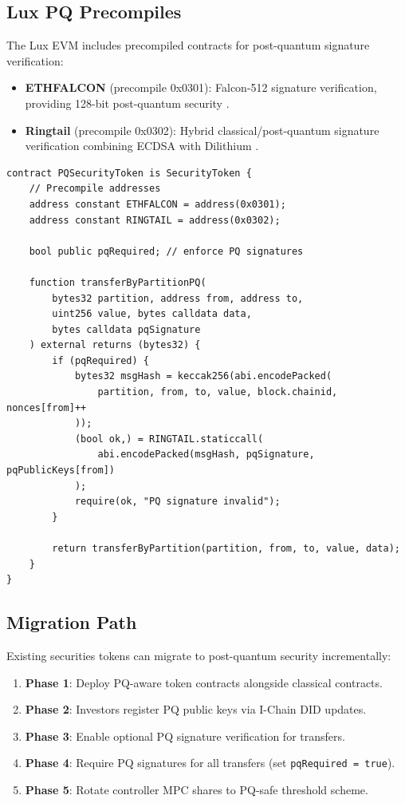 \documentclass[11pt,a4paper]{article}
\begin{document}
\subsection{Lux PQ Precompiles}

The Lux EVM includes precompiled contracts for post-quantum signature verification:

\begin{itemize}[nosep]
  \item \textbf{ETHFALCON} (precompile 0x0301): Falcon-512 signature verification, providing 128-bit post-quantum security \cite{lux-ethfalcon-pq}.
  \item \textbf{Ringtail} (precompile 0x0302): Hybrid classical/post-quantum signature verification combining ECDSA with Dilithium \cite{lux-mchain-mpc}.
\end{itemize}

\begin{lstlisting}[language=Solidity,caption={Post-quantum transfer verification.}]
contract PQSecurityToken is SecurityToken {
    // Precompile addresses
    address constant ETHFALCON = address(0x0301);
    address constant RINGTAIL = address(0x0302);

    bool public pqRequired; // enforce PQ signatures

    function transferByPartitionPQ(
        bytes32 partition, address from, address to,
        uint256 value, bytes calldata data,
        bytes calldata pqSignature
    ) external returns (bytes32) {
        if (pqRequired) {
            bytes32 msgHash = keccak256(abi.encodePacked(
                partition, from, to, value, block.chainid, nonces[from]++
            ));
            (bool ok,) = RINGTAIL.staticcall(
                abi.encodePacked(msgHash, pqSignature, pqPublicKeys[from])
            );
            require(ok, "PQ signature invalid");
        }

        return transferByPartition(partition, from, to, value, data);
    }
}
\end{lstlisting}

\subsection{Migration Path}

Existing securities tokens can migrate to post-quantum security incrementally:

\begin{enumerate}[nosep]
  \item \textbf{Phase 1}: Deploy PQ-aware token contracts alongside classical contracts.
  \item \textbf{Phase 2}: Investors register PQ public keys via I-Chain DID updates.
  \item \textbf{Phase 3}: Enable optional PQ signature verification for transfers.
  \item \textbf{Phase 4}: Require PQ signatures for all transfers (set \texttt{pqRequired = true}).
  \item \textbf{Phase 5}: Rotate controller MPC shares to PQ-safe threshold scheme.
\end{enumerate}
\end{document}
